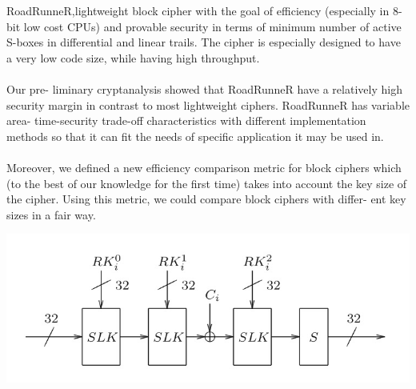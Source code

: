 \section*{\fontsize{25}{29}\selectfont{\textbf Literature Survey} \\}
{\fontsize{20}{24}\selectfont{\color{red} {RoadRunneR  }}}

\paragraph{} RoadRunneR,lightweight block cipher with the goal of efficiency (especially in 8-bit low cost CPUs) and provable security in terms of minimum number of active S-boxes in differential and linear trails. The cipher is especially designed to have a very low code size, while having high throughput.\\ \\
Our pre- liminary cryptanalysis showed that RoadRunneR have a relatively high security margin in contrast to most lightweight ciphers. RoadRunneR has variable area- time-security trade-off characteristics with different implementation methods so that it can fit the needs of specific application it may be used in.\\ \\
Moreover, we defined a new efficiency comparison metric for block ciphers which (to the best of our knowledge for the first time) takes into account the key size of the cipher. Using this metric, we could compare block ciphers with differ- ent key sizes in a fair way.

\includegraphics[scale=0.6]{project/images/1.jpg}

